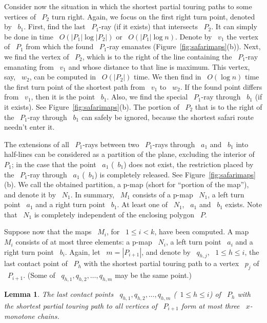 \documentclass[11pt]{article}
\newtheorem{lemma}{Lemma}
\begin{document}
Consider now the situation in which the shortest partial touring paths to some vertices of ~\(P_2\) turn right.
Again, we focus on the first right turn point, denoted by ~\(b_1\).
First, find the last ~\(P_1\)-ray (if it exists) that intersects ~\(P_2\).
It can simply be done in time ~\(O(|P_1|\log|P_2|)\) or ~\(O(|P_1|\log n)\).
Denote by ~\(v_1\) the vertex of ~\(P_1\) from which the found ~\(P_1\)-ray emanates (Figure~\ref{fig:safarimaps}(b)).
Next, we find the vertex of ~\(P_2\), which is to the right of the line containing the ~\(P_1\)-ray emanating from ~\(v_1\) and whose distance to that line is maximum.
This vertex, say, ~\(w_2\), can be computed in ~\(O(|P_2|)\) time.
We then find in ~\(O(\log n)\) time the first turn point of the shortest path from ~\(v_1\) to ~\(w_2\).
If the found point differs from ~\(v_1\), then it is the point ~\(b_1\).
Also, we find the special ~\(P_1\)-ray through ~\(b_1\) (if it exists).
See Figure~\ref{fig:safarimaps}(b).
The portion of ~\(P_2\) that is to the right of the ~\(P_1\)-ray through ~\(b_1\) can safely be ignored, because the shortest safari route needn't enter it.

The extensions of all ~\(P_1\)-rays between two ~\(P_1\)-rays through ~\(a_1\) and ~\(b_1\) into half-lines can be considered as a partition of the plane, excluding the interior of ~\(P_1\); in the case that the point ~\(a_1\) (~\(b_1\)) does not exist, the restriction placed by the ~\(P_1\)-ray through ~\(a_1\) (~\(b_1\)) is completely released.
See Figure~\ref{fig:safarimaps}(b).
We call the obtained partition, a p-map (short for ``portion of the map''), and denote it by ~\(N_1\).
In summary, ~\(M_1\) consists of a p-map ~\(N_1\), a left turn point ~\(a_1\) and a right turn point ~\(b_1\).
At least one of ~\(N_1\), ~\(a_1\) and ~\(b_1\) exists.
Note that ~\(N_1\) is completely independent of the enclosing polygon ~\(P\).

Suppose now that the maps ~\(M_i\), for ~\(1 \le i < k\), have been computed.
A map ~\(M_i\) consists of at most three elements: a p-map ~\(N_i\), a left turn point ~\(a_i\) and a right turn point ~\(b_i\).
Again, let ~\(m = |P_{i+1}|\), and denote by ~\(q_{h,j}\), ~\(1 \le h \le i\), the last contact point of ~\(P_h\) with the shortest partial touring path to a vertex ~\(p_j\) of ~\(P_{i+1}\).
(Some of ~\(q_{h,1}, q_{h,2}, \ldots, q_{h,m}\) may be the same point.)

\begin{lemma}
\label{lem:safari-xmonotone}
The last contact points ~\(q_{h,1}, q_{h,2}, \ldots, q_{h,m}\) (~\(1 \le h \le i\)) of ~\(P_h\) with the shortest partial touring path to all vertices of ~\(P_{i+1}\) form at most three ~\(x\)-monotone chains.
\end{lemma}
\end{document}
